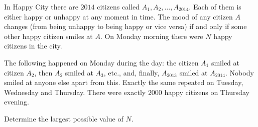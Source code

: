 In Happy City there are $2014$ citizens called $A_1, A_2, \dots , A_{2014}$. Each of them is either happy or unhappy at any moment in time. The mood of any citizen $A$ changes (from being unhappy to being happy or vice versa) if and only if some other happy citizen smiles at $A$. On Monday morning there were $N$ happy citizens in the city.

The following happened on Monday during the day: the citizen $A_1$ smiled at citizen $A_2$,  then $A_2$ smiled at $A_3$,  etc., and, finally, $A_{2013}$ smiled at $A_{2014}$. Nobody smiled at anyone else apart from this. Exactly the same repeated on Tuesday, Wednesday and Thursday. There were exactly $2000$ happy citizens on Thursday evening.

Determine the largest possible value of $N$.